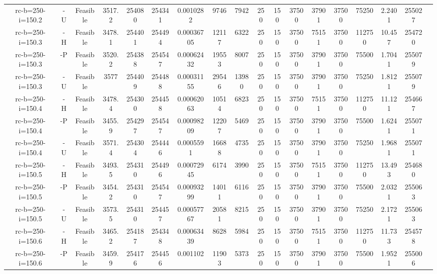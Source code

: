\documentclass[landscape, a4paper]{article}
\begin{document}
\begin{center}
\begin{tabular}{@{}cccccccccccccccccc@{}}
rc-b=250-i=150.2 & -U & Feasible & 3517.2 & 254080 & 254341 & 0.0010282 & 9746 & 7942 & 250 & 150 & 37500 & 37901 & 37500 & 75250 & 2.2401 & 255027 & \\
rc-b=250-i=150.3 & -H & Feasible & 3478.1 & 254401 & 254494 & 0.00036705 & 12117 & 6322 & 250 & 150 & 37500 & 75151 & 37500 & 112750 & 10.457 & 254720 & \\
rc-b=250-i=150.3 & -P & Feasible & 3520.2 & 254388 & 254547 & 0.00062432 & 19553 & 8007 & 250 & 150 & 37500 & 37901 & 37500 & 75500 & 1.7041 & 255079 & \\
rc-b=250-i=150.3 & -U & Feasible & 3577 & 254409 & 254488 & 0.00031155 & 29546 & 13980 & 250 & 150 & 37500 & 37901 & 37500 & 75250 & 1.8121 & 255079 & \\
rc-b=250-i=150.4 & -H & Feasible & 3478.4 & 254300 & 254458 & 0.00062063 & 10514 & 6823 & 250 & 150 & 37500 & 75151 & 37500 & 112750 & 11.121 & 254667 & \\
rc-b=250-i=150.4 & -P & Feasible & 3455.9 & 254297 & 254547 & 0.00098209 & 12207 & 5469 & 250 & 150 & 37500 & 37901 & 37500 & 75500 & 1.6241 & 255071 & \\
rc-b=250-i=150.4 & -U & Feasible & 3571.4 & 254304 & 254446 & 0.0005591 & 16688 & 4735 & 250 & 150 & 37500 & 37901 & 37500 & 75250 & 1.9681 & 255071 & \\
rc-b=250-i=150.5 & -H & Feasible & 3493.5 & 254310 & 254496 & 0.00072945 & 6174 & 3990 & 250 & 150 & 37500 & 75151 & 37500 & 112750 & 13.493 & 254680 & \\
rc-b=250-i=150.5 & -P & Feasible & 3454.2 & 254310 & 254547 & 0.00093299 & 14011 & 6116 & 250 & 150 & 37500 & 37901 & 37500 & 75500 & 2.0321 & 255063 & \\
rc-b=250-i=150.5 & -U & Feasible & 3573.5 & 254310 & 254457 & 0.00057767 & 20581 & 8215 & 250 & 150 & 37500 & 37901 & 37500 & 75250 & 2.1721 & 255063 & \\
rc-b=250-i=150.6 & -H & Feasible & 3465.2 & 254187 & 254348 & 0.00063439 & 8628 & 5984 & 250 & 150 & 37500 & 75151 & 37500 & 112750 & 11.733 & 254578 & \\
rc-b=250-i=150.6 & -P & Feasible & 3459.9 & 254176 & 254456 & 0.001102 & 11903 & 5373 & 250 & 150 & 37500 & 37901 & 37500 & 75500 & 1.9521 & 255006 & \\
\end{tabular}
\end{center}
\end{document}
